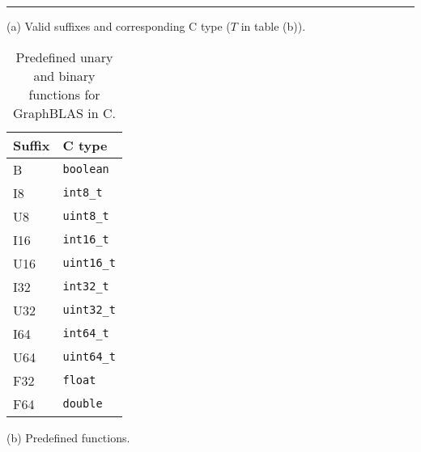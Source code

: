 \begin{table}
\hrule
\begin{center}
\caption{Predefined unary and binary functions for GraphBLAS in C.}
\label{Tab:PredefinedFunctions}

\vspace{1\baselineskip}
(a) Valid suffixes and corresponding C type ($T$ in table (b)).
\vspace{1\baselineskip}

\begin{tabular}{l|l}
Suffix		& C type \\ \hline
{\sf B}		& {\tt boolean} \\
{\sf I8}	& {\tt int8\_t} \\
{\sf U8}	& {\tt uint8\_t} \\
{\sf I16}	& {\tt int16\_t} \\
{\sf U16}	& {\tt uint16\_t} \\
{\sf I32}	& {\tt int32\_t} \\
{\sf U32}	& {\tt uint32\_t} \\
{\sf I64}	& {\tt int64\_t} \\
{\sf U64}	& {\tt uint64\_t} \\
{\sf F32}	& {\tt float} \\
{\sf F64}	& {\tt double} \\
\end{tabular}

\vspace{1\baselineskip}
(b) Predefined functions.
\vspace{1\baselineskip}


\end{center}
\end{table}
